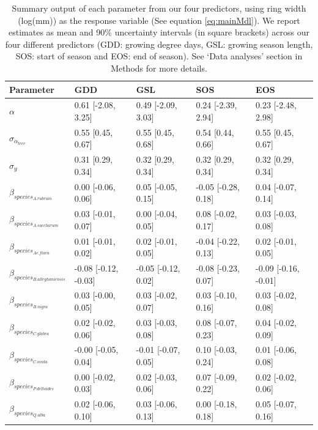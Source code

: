 \begin{table}[ht]
\centering
\caption{Summary output of each parameter from our four predictors, using ring width (log(mm)) as the response variable (See equation \ref{eq:mainMdl}). We report estimates as mean and 90\% uncertainty intervals (in square brackets) across our four different predictors (GDD: growing degree days, GSL: growing season length, SOS: start of season and EOS: end of season). See `Data analyses' section in Methods for more details.} 
\label{tab:tab_all}
\begin{tabular}{lllll}
  \hline
Parameter & GDD & GSL & SOS & EOS \\ 
  \hline
$\alpha$ & 0.61 [-2.08, 3.25] & 0.49 [-2.09, 3.03] & 0.24 [-2.39, 2.94] & 0.23 [-2.48, 2.98] \\ 
  $\sigma_{\alpha_{tree}}$ & 0.55 [0.45, 0.67] & 0.55 [0.45, 0.68] & 0.54 [0.44, 0.66] & 0.55 [0.45, 0.67] \\ 
  $\sigma_{y}$ & 0.31 [0.29, 0.34] & 0.32 [0.29, 0.34] & 0.32 [0.29, 0.34] & 0.32 [0.29, 0.34] \\ 
  $\beta_{species_{A. rubrum}}$ & 0.00 [-0.06, 0.06] & 0.05 [-0.05, 0.15] & -0.05 [-0.28, 0.18] & 0.04 [-0.07, 0.14] \\ 
  $\beta_{species_{A. saccharum}}$ & 0.03 [-0.01, 0.07] & 0.00 [-0.04, 0.05] & 0.08 [-0.02, 0.17] & 0.03 [-0.03, 0.08] \\ 
  $\beta_{species_{Ae. flava}}$ & 0.01 [-0.01, 0.02] & 0.02 [-0.01, 0.05] & -0.04 [-0.22, 0.13] & 0.02 [-0.01, 0.05] \\ 
  $\beta_{species_{B. alleghaniensis}}$ & -0.08 [-0.12, -0.03] & -0.05 [-0.12, 0.02] & -0.08 [-0.23, 0.07] & -0.09 [-0.16, -0.01] \\ 
  $\beta_{species_{B. nigra}}$ & 0.03 [-0.00, 0.05] & 0.03 [-0.02, 0.07] & 0.03 [-0.10, 0.16] & 0.03 [-0.02, 0.08] \\ 
  $\beta_{species_{C. glabra}}$ & 0.02 [-0.02, 0.06] & 0.03 [-0.03, 0.08] & 0.08 [-0.07, 0.23] & 0.04 [-0.02, 0.09] \\ 
  $\beta_{species_{C. ovata}}$ & -0.00 [-0.05, 0.04] & -0.01 [-0.07, 0.05] & 0.10 [-0.03, 0.24] & 0.01 [-0.06, 0.08] \\ 
  $\beta_{species_{P. deltoides}}$ & 0.00 [-0.02, 0.03] & 0.02 [-0.03, 0.06] & 0.07 [-0.09, 0.22] & 0.02 [-0.02, 0.06] \\ 
  $\beta_{species_{Q. alba}}$ & 0.02 [-0.06, 0.10] & 0.03 [-0.06, 0.13] & 0.00 [-0.18, 0.18] & 0.05 [-0.07, 0.16] \\ 

\end{tabular}
\end{table}
